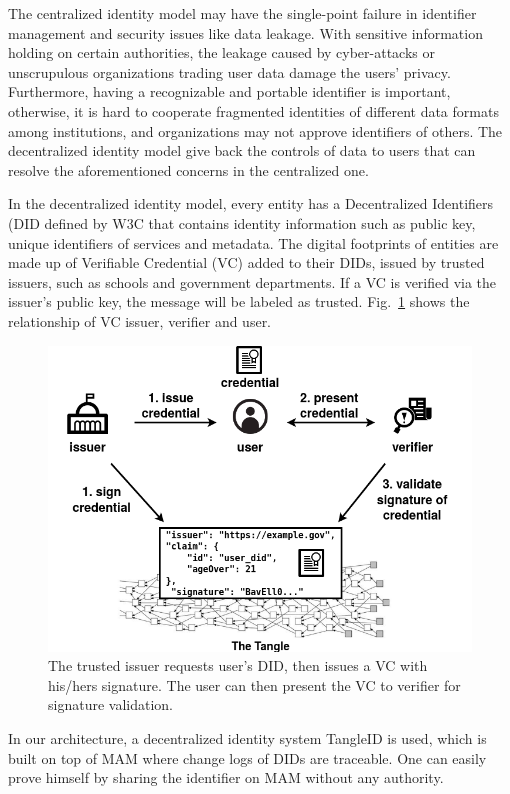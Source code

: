 \begin{spacing}{2.0}
The centralized identity model may have the single-point failure in identifier management and security issues like data leakage. With sensitive information holding on certain authorities, the leakage caused by cyber-attacks or unscrupulous organizations trading user data damage the users' privacy. Furthermore, having a recognizable and portable identifier is important, otherwise, it is hard to cooperate fragmented identities of different data formats among institutions, and organizations may not approve identifiers of others. The decentralized identity model give back the controls of data to users that can resolve the aforementioned concerns in the centralized one.

In the decentralized identity model, every entity has a Decentralized Identifiers (DID\cite{DID} defined by W3C that contains identity information such as public key, unique identifiers of services and metadata. The digital footprints of entities are made up of Verifiable Credential (VC) added to their DIDs, issued by trusted issuers, such as schools and government departments. If a VC is verified via the issuer's public key, the message will be labeled as trusted. Fig.~\ref{fig:did_vc} shows the relationship of VC issuer, verifier and user.

\begin{figure}[h]
    \centering
    \includegraphics[width=4.5in]{img/DID_VC}
    \caption{The trusted issuer requests user's DID, then issues a VC with his/hers signature. The user can then present the VC to verifier for signature validation.}
    \label{fig:did_vc}
\end{figure}

In our architecture, a decentralized identity system TangleID\cite{TangleID} is used, which is built on top of MAM where change logs of DIDs are traceable. One can easily prove himself by sharing the identifier on MAM without any authority.


\end{spacing}
